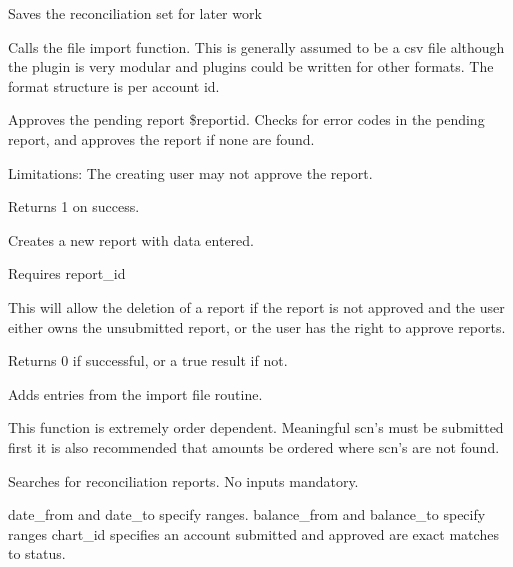 \begin{description}
\begin{description}
\begin{description}
\begin{description}
\begin{description}
\begin{description}
\begin{description}
\begin{description}
\begin{description}
\begin{description}
Saves the reconciliation set for later work


\item[{import\_file}] \mbox{}

Calls the file import function.  This is generally assumed to be a csv file
although the plugin is very modular and plugins could be written for other 
formats.  The format structure is per account id.


\item[{approve(\$self,\$reportid)}] \mbox{}

Approves the pending report \$reportid.
Checks for error codes in the pending report, and approves the report if none
are found.



Limitations: The creating user may not approve the report.



Returns 1 on success.


\item[{new\_report}] \mbox{}

Creates a new report with data entered.


\item[{delete (\$self, \$report\_id)}] \mbox{}

Requires report\_id



This will allow the deletion of a report if the report is not approved and 
the user either owns the unsubmitted report, or the user has the right to 
approve reports.



Returns 0 if successful, or a true result if not.


\item[{add\_entries}] \mbox{}

Adds entries from the import file routine.



This function is extremely order dependent.  Meaningful scn's must be submitted 
first it is also recommended that amounts be ordered where scn's are not found.


\item[{search}] \mbox{}

Searches for reconciliation reports.  No inputs mandatory.



date\_from and date\_to specify ranges.
balance\_from and balance\_to specify ranges
chart\_id specifies an account
submitted and approved are exact matches to status.



\end{description}
\end{description}
\end{description}
\end{description}
\end{description}
\end{description}
\end{description}
\end{description}
\end{description}
\end{description}
